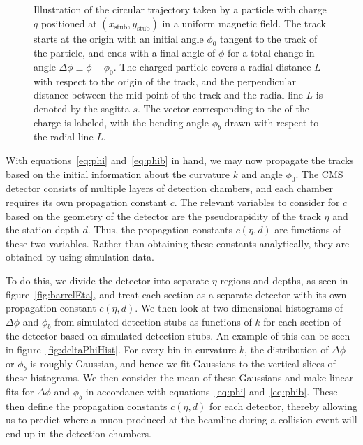 \begin{figure}[htbp]
  \centering
  
  \caption{
    Illustration of the circular trajectory taken by a particle with charge $q$ positioned at $(x_\mathrm{stub},y_\mathrm{stub})$ in a uniform magnetic field.
    The track starts at the origin with an initial angle $\phi_0$ tangent to the track of the particle, and ends with a final angle of $\phi$ for a total change in angle $\Delta\phi\equiv\phi-\phi_0$.
    The charged particle covers a radial distance $L$ with respect to the origin of the track, and the perpendicular distance between the mid-point of the track and the radial line $L$ is denoted by the sagitta $s$.
    The vector corresponding to the \pt of the charge is labeled, with the bending angle $\phi_b$ drawn with respect to the radial line $L$.
  }
  \label{fig:arc}
\end{figure}

With equations~\ref{eq:phi} and~\ref{eq:phib} in hand, we may now propagate the tracks based on the initial information about the curvature $k$ and angle $\phi_0$.
The CMS detector consists of multiple layers of detection chambers, and each chamber requires its own propagation constant $c$.
The relevant variables to consider for $c$ based on the geometry of the detector are the pseudorapidity of the track $\eta$ and the station depth $d$.
Thus, the propagation constants $c(\eta,d)$ are functions of these two variables.
Rather than obtaining these constants analytically, they are obtained by using simulation data. %

To do this, we divide the detector into separate $\eta$ regions and depths, as seen in figure~\ref{fig:barrelEta}, and treat each section as a separate detector with its own propagation constant $c(\eta,d)$.
We then look at two-dimensional histograms of $\Delta\phi$ and $\phi_b$ from simulated detection stubs as functions of $k$ for each section of the detector based on simulated detection stubs.
An example of this can be seen in figure~\ref{fig:deltaPhiHist}.
For every bin in curvature $k$, the distribution of $\Delta\phi$ or $\phi_b$ is roughly Gaussian, and hence we fit Gaussians to the vertical slices of these histograms.
We then consider the mean of these Gaussians and make linear fits for $\Delta\phi$ and $\phi_b$ in accordance with equations~\ref{eq:phi} and~\ref{eq:phib}.
These then define the propagation constants $c(\eta,d)$ for each detector, thereby allowing us to predict where a muon produced at the beamline during a collision event will end up in the detection chambers.

